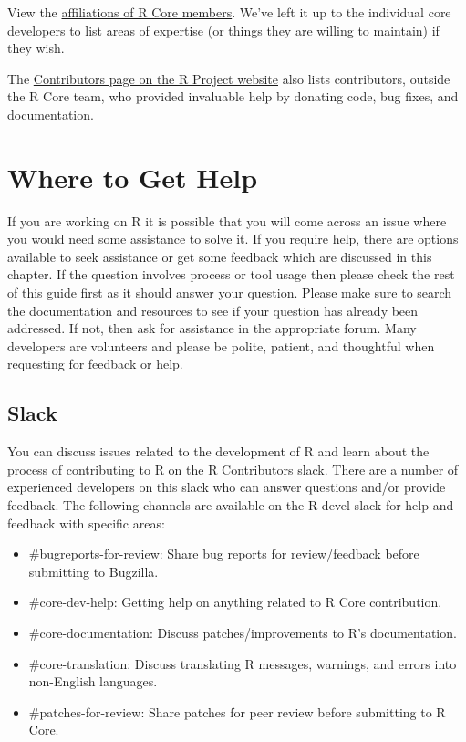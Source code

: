 \documentclass[
]{book}
\begin{document}
View the \href{}{affiliations of R Core members}. We've left it up to the individual core developers to list areas of expertise (or things they are willing to maintain) if they wish.

The \href{https://www.r-project.org/contributors.html}{Contributors page on the R Project website} also lists contributors, outside the R Core team, who provided invaluable help by donating code, bug fixes, and documentation.

\hypertarget{WhereToGetHelp}{%
\chapter{Where to Get Help}\label{WhereToGetHelp}}

If you are working on R it is possible that you will come across an issue where you would need some assistance to solve it. If you require help, there are options available to seek assistance or get some feedback which are discussed in this chapter. If the question involves process or tool usage then please check the rest of this guide first as it should answer your question. Please make sure to search the documentation and resources to see if your question has already been addressed. If not, then ask for assistance in the appropriate forum. Many developers are volunteers and please be polite, patient, and thoughtful when requesting for feedback or help.

\hypertarget{slack}{%
\section{Slack}\label{slack}}

You can discuss issues related to the development of R and learn about the process of contributing to R on the \href{https://r-contributors.slack.com/}{R Contributors slack}. There are a number of experienced developers on this slack who can answer questions and/or provide feedback. The following channels are available on the R-devel slack for help and feedback with specific areas:

\begin{itemize}
\item
  \#bugreports-for-review: Share bug reports for review/feedback before submitting to Bugzilla.
\item
  \#core-dev-help: Getting help on anything related to R Core contribution.
\item
  \#core-documentation: Discuss patches/improvements to R's documentation.
\item
  \#core-translation: Discuss translating R messages, warnings, and errors into non-English languages.
\item
  \#patches-for-review: Share patches for peer review before submitting to R Core.
\end{itemize}
\end{document}
